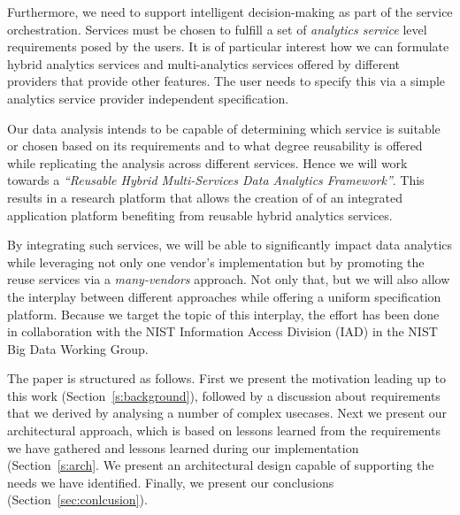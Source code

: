 Furthermore, we need to support intelligent decision-making as part of
the service orchestration. Services must be chosen to fulfill a set of
{\em analytics service} level requirements posed by the users. It is
of particular interest how we can formulate hybrid analytics services
and multi-analytics services offered by different providers that
provide other features. The user needs to specify this via a simple
analytics service provider independent specification.

Our data analysis intends to be capable of determining which service is
suitable or chosen based on its requirements and to what degree
reusability is offered while replicating the analysis across different
services. Hence we will work towards a {\em ``Reusable Hybrid
Multi-Services Data Analytics Framework''}. This results in a research
platform that allows the creation of of an integrated application
platform benefiting from reusable hybrid analytics services.


By integrating such services, we will be able to significantly impact
data analytics while leveraging not only one vendor's implementation
but by promoting the reuse services via a {\em many-vendors}
approach. Not only that, but we will also allow the interplay between
different approaches while offering a uniform specification platform.
Because we target the topic of this interplay, the effort has been
done in collaboration with the NIST Information Access Division (IAD)
in the NIST Big Data Working Group.

The paper is structured as follows. First we present the motivation
leading up to this work (Section~\ref{s:background}), followed by a
discussion about requirements that we derived by analysing a number of
complex usecases. Next we present our architectural approach, which is
based on lessons learned from the requirements we have gathered and
lessons learned during our implementation (Section~\ref{s:arch}. We
present an architectural design capable of supporting the needs we
have identified.  Finally, we present our conclusions
(Section~\ref{sec:conlcusion}).
